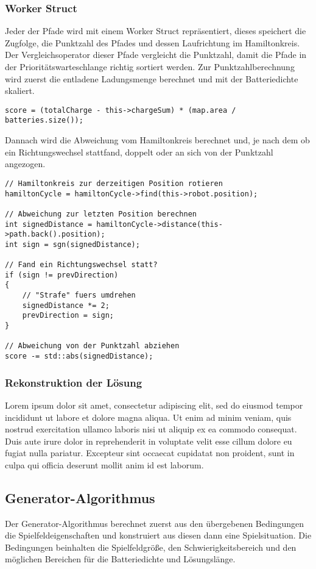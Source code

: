 \documentclass[a4paper,10pt,ngerman]{scrartcl}
\begin{document}
\subsubsection{Worker Struct}
Jeder der Pfade wird mit einem Worker Struct repräsentiert, dieses speichert die Zugfolge,
die Punktzahl des Pfades und dessen Laufrichtung im Hamiltonkreis.
Der Vergleichsoperator dieser Pfade vergleicht die Punktzahl, damit die Pfade in der Prioritätswarteschlange richtig sortiert werden.
Zur Punktzahlberechnung wird zuerst die entladene Ladungsmenge berechnet und mit der Batteriedichte skaliert.

\begin{lstlisting}[frame=single]
score = (totalCharge - this->chargeSum) * (map.area / batteries.size());
\end{lstlisting}

Dannach wird die Abweichung vom Hamiltonkreis berechnet und, je nach dem ob ein Richtungswechsel stattfand,
doppelt oder an sich von der Punktzahl angezogen.

\begin{lstlisting}[frame=single]
// Hamiltonkreis zur derzeitigen Position rotieren
hamiltonCycle = hamiltonCycle->find(this->robot.position);

// Abweichung zur letzten Position berechnen
int signedDistance = hamiltonCycle->distance(this->path.back().position);
int sign = sgn(signedDistance);

// Fand ein Richtungswechsel statt?
if (sign != prevDirection)
{
	// "Strafe" fuers umdrehen
	signedDistance *= 2;
	prevDirection = sign;
}

// Abweichung von der Punktzahl abziehen
score -= std::abs(signedDistance);
\end{lstlisting}

\subsubsection{Rekonstruktion der Lösung}
Lorem ipsum dolor sit amet, consectetur adipiscing elit, sed do eiusmod tempor incididunt ut labore et dolore magna aliqua.
Ut enim ad minim veniam, quis nostrud exercitation ullamco laboris nisi ut aliquip ex ea commodo consequat.
Duis aute irure dolor in reprehenderit in voluptate velit esse cillum dolore eu fugiat nulla pariatur.
Excepteur sint occaecat cupidatat non proident, sunt in culpa qui officia deserunt mollit anim id est laborum.

\subsection{Generator-Algorithmus}
Der Generator-Algorithmus berechnet zuerst aus den übergebenen Bedingungen die Spielfeldeigenschaften
und konstruiert aus diesen dann eine Spielsituation.
Die Bedingungen beinhalten die Spielfeldgröße, den Schwierigkeitsbereich und den möglichen Bereichen für die Batteriedichte und Lösungslänge.
\end{document}
